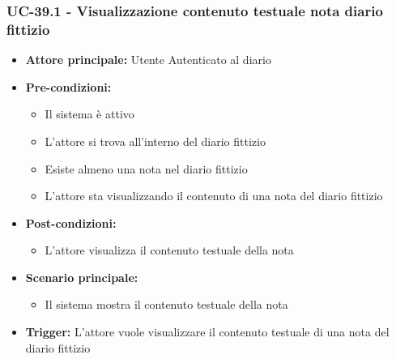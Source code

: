 \documentclass[a4paper,12pt]{article}
\begin{document}
\subsubsection{UC-39.1 - Visualizzazione contenuto testuale nota diario fittizio} \label{subsec:UC-39.1}
\begin{itemize}
    \item \textbf{Attore principale:} Utente Autenticato al diario
    \item \textbf{Pre-condizioni:}
    \begin{itemize}
        \item Il sistema è attivo
        \item L'attore si trova all'interno del diario fittizio
        \item Esiste almeno una nota nel diario fittizio
        \item L'attore sta visualizzando il contenuto di una nota del diario fittizio
    \end{itemize}
    \item \textbf{Post-condizioni:}
    \begin{itemize}
        \item L'attore visualizza il contenuto testuale della nota
    \end{itemize}
    \item \textbf{Scenario principale:}
    \begin{itemize}
        \item Il sistema mostra il contenuto testuale della nota 
    \end{itemize}
    \item \textbf{Trigger:} L'attore vuole visualizzare il contenuto testuale di una nota del diario fittizio
\end{itemize}
\end{document}
